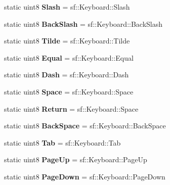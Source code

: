 \begin{DoxyCompactItemize}
static uint8 {\bfseries Slash} = sf\+::\+Keyboard\+::\+Slash
\item 
\mbox{\label{structrvl_1_1_keyboard_a4b25608530e36a4f06e0c2134a259f67}} 
static uint8 {\bfseries Back\+Slash} = sf\+::\+Keyboard\+::\+Back\+Slash
\item 
\mbox{\label{structrvl_1_1_keyboard_a352d32628216a6be1dd6aa5070d751f6}} 
static uint8 {\bfseries Tilde} = sf\+::\+Keyboard\+::\+Tilde
\item 
\mbox{\label{structrvl_1_1_keyboard_a5a402e6c965bff5646a6a7b85e8517e7}} 
static uint8 {\bfseries Equal} = sf\+::\+Keyboard\+::\+Equal
\item 
\mbox{\label{structrvl_1_1_keyboard_a5c0866564de3b30612e5a0e8d5a44c6c}} 
static uint8 {\bfseries Dash} = sf\+::\+Keyboard\+::\+Dash
\item 
\mbox{\label{structrvl_1_1_keyboard_a4afe87cffdf770c07fb138459bf2fed0}} 
static uint8 {\bfseries Space} = sf\+::\+Keyboard\+::\+Space
\item 
\mbox{\label{structrvl_1_1_keyboard_a6675e40d3dc7cba5f74d3a533de0ddd2}} 
static uint8 {\bfseries Return} = sf\+::\+Keyboard\+::\+Space
\item 
\mbox{\label{structrvl_1_1_keyboard_afb7b19bf71ac928af89c4142a87ae0a6}} 
static uint8 {\bfseries Back\+Space} = sf\+::\+Keyboard\+::\+Back\+Space
\item 
\mbox{\label{structrvl_1_1_keyboard_a97ae5c5f5a93842685af2f407bde0197}} 
static uint8 {\bfseries Tab} = sf\+::\+Keyboard\+::\+Tab
\item 
\mbox{\label{structrvl_1_1_keyboard_aac31409efbab21372ee4ea48cec9272b}} 
static uint8 {\bfseries Page\+Up} = sf\+::\+Keyboard\+::\+Page\+Up
\item 
\mbox{\label{structrvl_1_1_keyboard_a46aea47b4c11763f2575122594c5c55c}} 
static uint8 {\bfseries Page\+Down} = sf\+::\+Keyboard\+::\+Page\+Down

\end{DoxyCompactItemize}
